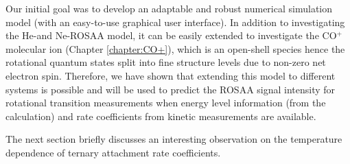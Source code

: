 Our initial goal was to develop an adaptable and robust numerical
simulation model (with an easy-to-use graphical user interface). In addition to
investigating the He-\CD and Ne-\CD ROSAA model, it can be easily extended to investigate the
CO$^+$ molecular ion (Chapter \ref{chapter:CO+}), which is an open-shell
species hence the rotational quantum states split into fine structure levels
due to non-zero net electron spin. Therefore, we have shown that extending this
model to different systems is possible and will be used to predict the ROSAA
signal intensity for rotational transition measurements when energy level
information (from the calculation) and rate coefficients from kinetic
measurements are available.

The next section briefly discusses an interesting observation on the
temperature dependence of ternary attachment rate coefficients.

